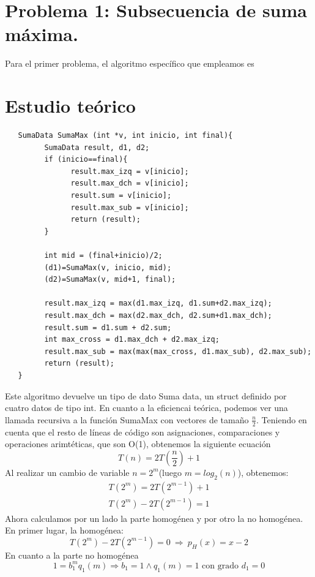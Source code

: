 \documentclass[11pt,openany]{book}
\begin{document}
\section{Problema 1: Subsecuencia de suma máxima.}
Para el primer problema, el algoritmo específico que empleamos es 
\section*{Estudio teórico}
\begin{lstlisting}
   SumaData SumaMax (int *v, int inicio, int final){
         SumaData result, d1, d2;
         if (inicio==final){
               result.max_izq = v[inicio];
               result.max_dch = v[inicio];
               result.sum = v[inicio];
               result.max_sub = v[inicio];
               return (result);
         }

         int mid = (final+inicio)/2;
         (d1)=SumaMax(v, inicio, mid);
         (d2)=SumaMax(v, mid+1, final);
            
         result.max_izq = max(d1.max_izq, d1.sum+d2.max_izq);
         result.max_dch = max(d2.max_dch, d2.sum+d1.max_dch);
         result.sum = d1.sum + d2.sum;
         int max_cross = d1.max_dch + d2.max_izq;
         result.max_sub = max(max(max_cross, d1.max_sub), d2.max_sub);
         return (result);
   }
\end{lstlisting}
Este algoritmo devuelve un tipo de dato Suma data, un struct definido por cuatro datos de tipo int. En cuanto
a la eficiencai teórica, podemos ver una llamada recursiva a la función SumaMax con vectores de tamaño $\frac{n}{2}$. 
Teniendo en cuenta que el resto de líneas de código son asignaciones, comparaciones y operaciones arimtéticas, que son O(1), obtenemos 
la siguiente ecuación
\begin{equation*}
      T(n)=2T(\frac{n}{2})+1
\end{equation*}
Al realizar un cambio de variable $n=2^m$(luego $m=log_2(n)$), obtenemos:
\begin{gather*}
      T(2^m)=2T(2^{m-1})+1 \\
      T(2^m)-2T(2^{m-1})=1
\end{gather*}
Ahora calculamos por un lado la parte homogénea y por otro la no homogénea. En primer lugar, la homogénea:
\begin{equation*}
      T(2^m)-2T(2^{m-1})=0 \  \Longrightarrow  \ p_H(x)=x-2
\end{equation*}
En cuanto a la parte no homogénea
\begin{equation*}
      1=b_1^m q_1(m) \Longrightarrow b_1=1 \wedge q_1(m)=1 \text{ con grado } d_1=0
\end{equation*}
\end{document}

